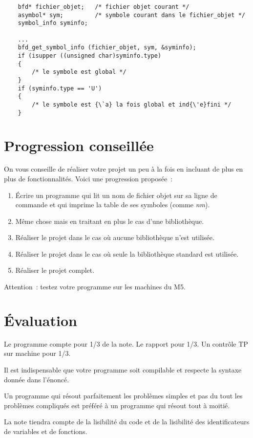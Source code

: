 \documentclass{article}
\begin{document}
\begin{verbatim}
    bfd* fichier_objet;   /* fichier objet courant */
    asymbol* sym;         /* symbole courant dans le fichier_objet */
    symbol_info syminfo;

    ...
    bfd_get_symbol_info (fichier_objet, sym, &syminfo);
    if (isupper ((unsigned char)syminfo.type)
    { 
        /* le symbole est global */
    }
    if (syminfo.type == 'U')
    {
        /* le symbole est {\`a} la fois global et ind{\'e}fini */
    }
\end{verbatim}

\section{Progression conseill{\'e}e}

On vous conseille de r{\'e}aliser votre projet un peu {\`a} la fois en incluant
de plus en plus de fonctionnalit{\'e}s. Voici une progression propos{\'e}e~:

\begin{enumerate}
\item	{\'E}crire un programme qui lit un nom de fichier
	objet sur sa ligne de commande et qui imprime la table de
	ses symboles (comme {\em nm}).
\item	M{\^e}me chose mais en traitant en plus le cas d'une biblioth{\`e}que.
\item	R{\'e}aliser le projet dans le cas o{\`u} aucune biblioth{\`e}que n'est utilis{\'e}e.
\item	R{\'e}aliser le projet dans le cas o{\`u} seule la biblioth{\`e}que standard
	est utilis{\'e}e.
\item	R{\'e}aliser le projet complet.
\end{enumerate}

Attention~: testez votre programme sur les machines du M5.

\section{{\'E}valuation}

Le programme compte pour 1/3 de la note.
Le rapport pour 1/3. 
Un contr{\^o}le TP sur machine pour 1/3.

Il est indispensable que votre programme soit compilable et respecte
la syntaxe donn{\'e}e dans l'{\'e}nonc{\'e}.

Un programme qui r{\'e}sout parfaitement les probl{\`e}mes simples et pas du
tout les probl{\`e}mes compliqu{\'e}s est pr{\'e}f{\'e}r{\'e} {\`a} un programme qui r{\'e}sout
tout {\`a} moiti{\'e}.

La note tiendra compte de la lisibilit{\'e} du code et de la lisibilit{\'e}
des identificateurs de variables et de fonctions.
\end{document}
